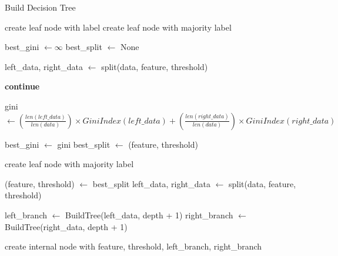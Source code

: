 


\begin{algorithm}
\caption{Build Decision Tree}
\begin{algorithmic}[1]
        \State \Return create leaf node with label
    \EndIf
        \State \Return create leaf node with majority label
    \EndIf

    \State best\_gini $\gets \infty$
    \State best\_split $\gets$ None

            \State left\_data, right\_data $\gets$ split(data, feature, threshold)

                \State \textbf{continue}
            \EndIf

            \State gini $\gets \left(\frac{len(left\_data)}{len(data)}\right) \times GiniIndex(left\_data) + \left(\frac{len(right\_data)}{len(data)}\right) \times GiniIndex(right\_data)$

                \State best\_gini $\gets$ gini
                \State best\_split $\gets$ (feature, threshold)
            \EndIf
        \EndFor
    \EndFor

        \State \Return create leaf node with majority label
    \EndIf

    \State (feature, threshold) $\gets$ best\_split
    \State left\_data, right\_data $\gets$ split(data, feature, threshold)

    \State left\_branch $\gets$ BuildTree(left\_data, depth + 1)
    \State right\_branch $\gets$ BuildTree(right\_data, depth + 1)

    \State \Return create internal node with feature, threshold, left\_branch, right\_branch
\EndFunction
\end{algorithmic}
\end{algorithm}


